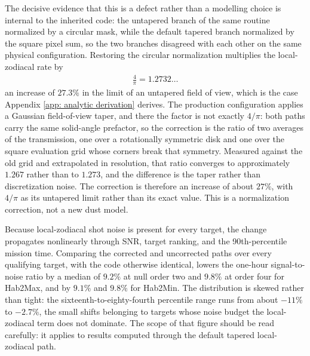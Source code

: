 \documentclass[12pt,a4paper]{article}
\numberwithin{equation}{section}
\numberwithin{figure}{section}
\numberwithin{table}{section}
\begin{document}
The decisive evidence that this is a defect rather than a modelling choice is internal to the inherited code: the untapered branch of the same routine normalized by a circular mask, while the default tapered branch normalized by the square pixel sum, so the two branches disagreed with each other on the same physical configuration. Restoring the circular normalization multiplies the local-zodiacal rate by
\begin{align}
\frac{4}{\pi}=1.2732\ldots
\end{align}
an increase of $27.3\%$ in the limit of an untapered field of view, which is the case Appendix \ref{app: analytic derivation} derives. The production configuration applies a Gaussian field-of-view taper, and there the factor is not exactly $4/\pi$: both paths carry the same solid-angle prefactor, so the correction is the ratio of two averages of the transmission, one over a rotationally symmetric disk and one over the square evaluation grid whose corners break that symmetry. Measured against the old grid and extrapolated in resolution, that ratio converges to approximately $1.267$ rather than to $1.273$, and the difference is the taper rather than discretization noise. The correction is therefore an increase of about $27\%$, with $4/\pi$ as its untapered limit rather than its exact value. This is a normalization correction, not a new dust model.

Because local-zodiacal shot noise is present for every target, the change propagates nonlinearly through SNR, target ranking, and the 90th-percentile mission time. Comparing the corrected and uncorrected paths over every qualifying target, with the code otherwise identical, lowers the one-hour signal-to-noise ratio by a median of $9.2\%$ at null order two and $9.8\%$ at order four for \mbox{Hab2Max}, and by $9.1\%$ and $9.8\%$ for \mbox{Hab2Min}. The distribution is skewed rather than tight: the sixteenth-to-eighty-fourth percentile range runs from about $-11\%$ to $-2.7\%$, the small shifts belonging to targets whose noise budget the local-zodiacal term does not dominate. The scope of that figure should be read carefully: it applies to results computed through the default tapered local-zodiacal path.
\end{document}
